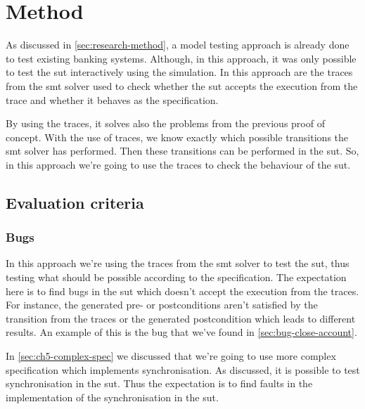 \section{Method}

As discussed in \autoref{sec:research-method}, a model testing approach is
already done to test existing banking systems. Although, in this approach, it
was only possible to test the \gls{sut} interactively using the simulation. In this
approach are the traces from the \gls{smt} solver used to check whether the
\gls{sut} accepts the execution from the trace and whether it behaves as the
specification.~\cite[p.5]{stoel_storm_vinju_bosman_2016}

By using the traces, it solves also the problems from the previous proof of
concept. With the use of traces, we know exactly which possible transitions the
\gls{smt} solver has performed. Then these transitions can be performed in the \gls{sut}.
So, in this approach we're going to use the traces to check the behaviour of the
\gls{sut}.

\subsection{Evaluation criteria}\label{sec:ch5-eval-criteria}

\subsubsection{Bugs}
In this approach we're using the traces from the \gls{smt} solver to test the
\gls{sut}, thus testing what should be possible according to the specification.
The expectation here is to find bugs in the \gls{sut} which doesn't accept the
execution from the traces. For instance, the generated pre- or postconditions
aren't satisfied by the transition from the traces or the generated
postcondition which leads to different results. An example of this is the bug
that we've found in \autoref{sec:bug-close-account}.

In \autoref{sec:ch5-complex-spec} we discussed that we're going to use more
complex specification which implements synchronisation. As discussed, it is
possible to test synchronisation in the \gls{sut}. Thus the expectation is to
find faults in the implementation of the synchronisation in the \gls{sut}.


